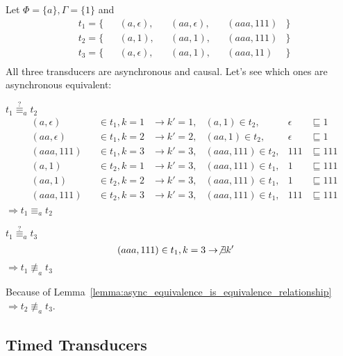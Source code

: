 \begin{exmp}[name = Asynchronous equivalence of Transducers]
  Let \(\Phi = \{a\}, \Gamma = \{1\}\) and \\
  \begin{align*}
    &t_1 = \{&&(a,\epsilon),  &&(aa,\epsilon),  &&(aaa,111)   &\} \\
    &t_2 = \{&&(a,1),         &&(aa,1),         &&(aaa,111)   &\} \\
    &t_3 = \{&&(a,\epsilon),  &&(aa,1),         &&(aaa,11)    &\}\\
  \end{align*}
  All three transducers are asynchronous and causal.
  Let's see which ones are asynchronous equivalent:

  \(t_1 \stackrel{?}{\equiv}_a t_2\)
  \begin{align*}
    &(a,\epsilon)  &&\in t_1, k = 1 &\rightarrow k' = 1, &(a,1)     \in t_2, &\epsilon  &\sqsubseteq 1 \\
    &(aa,\epsilon) &&\in t_1, k = 2 &\rightarrow k' = 2, &(aa,1)    \in t_2, &\epsilon  &\sqsubseteq 1 \\
    &(aaa,111)     &&\in t_1, k = 3 &\rightarrow k' = 3, &(aaa,111) \in t_2, &111       &\sqsubseteq 111 \\
    &(a,1)         &&\in t_2, k = 1 &\rightarrow k' = 3, &(aaa,111) \in t_1, &1         &\sqsubseteq 111 \\
    &(aa,1)        &&\in t_2, k = 2 &\rightarrow k' = 3, &(aaa,111) \in t_1, &1         &\sqsubseteq 111 \\
    &(aaa,111)     &&\in t_2, k = 3 &\rightarrow k' = 3, &(aaa,111) \in t_1, &111       &\sqsubseteq 111 \\
  \end{align*}
  \(\Rightarrow t_1 \equiv_a t_2\)

  \(t_1 \stackrel{?}{\equiv}_a t_3\)
  \begin{align*}
    &(aaa,111)     \in t_1, k = 3 \rightarrow \not\exists k'
  \end{align*}
  \(\Rightarrow t_1 \not\equiv_a t_3\)

  Because of Lemma~\ref{lemma:async_equivalence_is_equivalence_relationship} \(\Rightarrow t_2 \not\equiv_a t_3\).

\end{exmp}

\subsection{Timed Transducers}
\label{sec:concepts:def:timed_transducer}

